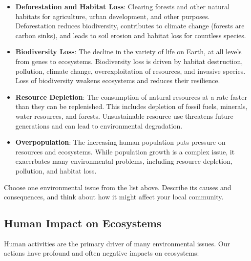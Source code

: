 \begin{itemize}
    \item \textbf{Deforestation and Habitat Loss}: Clearing forests and other natural habitats for agriculture, urban development, and other purposes. Deforestation reduces biodiversity, contributes to climate change (forests are carbon sinks), and leads to soil erosion and habitat loss for countless species.
    \item \textbf{Biodiversity Loss}: The decline in the variety of life on Earth, at all levels from genes to ecosystems. Biodiversity loss is driven by habitat destruction, pollution, climate change, overexploitation of resources, and invasive species.  Loss of biodiversity weakens ecosystems and reduces their resilience.
    \item \textbf{Resource Depletion}:  The consumption of natural resources at a rate faster than they can be replenished. This includes depletion of fossil fuels, minerals, water resources, and forests. Unsustainable resource use threatens future generations and can lead to environmental degradation.
    \item \textbf{Overpopulation}:  The increasing human population puts pressure on resources and ecosystems.  While population growth is a complex issue, it exacerbates many environmental problems, including resource depletion, pollution, and habitat loss.
\end{itemize}

\begin{stopandthink}
Choose one environmental issue from the list above. Describe its causes and consequences, and think about how it might affect your local community.
\end{stopandthink}

\subsection{Human Impact on Ecosystems}

Human activities are the primary driver of many environmental issues.  Our actions have profound and often negative impacts on ecosystems:

